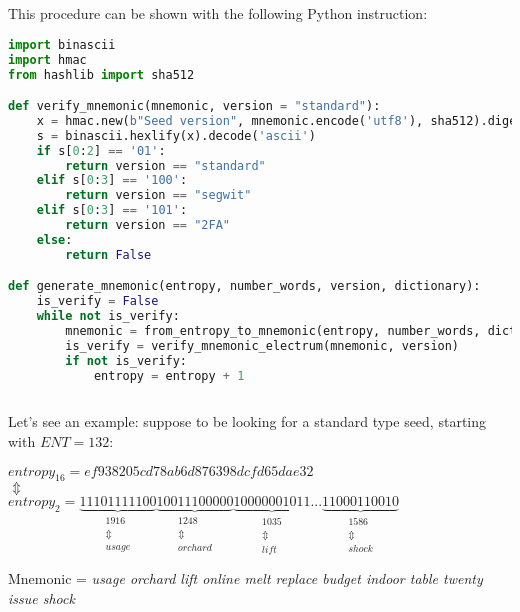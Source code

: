 \\ \\ 
This procedure can be shown with the following Python instruction:
\begin{lstlisting}[language=Python]
import binascii
import hmac
from hashlib import sha512

def verify_mnemonic(mnemonic, version = "standard"):
	x = hmac.new(b"Seed version", mnemonic.encode('utf8'), sha512).digest()
	s = binascii.hexlify(x).decode('ascii')
	if s[0:2] == '01':
		return version == "standard"
	elif s[0:3] == '100':
		return version == "segwit"
	elif s[0:3] == '101':
		return version == "2FA"
	else:
		return False

def generate_mnemonic(entropy, number_words, version, dictionary):	
	is_verify = False
	while not is_verify:
		mnemonic = from_entropy_to_mnemonic(entropy, number_words, dictionary)
		is_verify = verify_mnemonic_electrum(mnemonic, version)
		if not is_verify:
			entropy = entropy + 1
		
\end{lstlisting}

\begin{flushleft}
	Let's see an example: suppose to be looking for a standard type seed, starting with $ENT=132$:
\end{flushleft}

\begin{center} 
	$ entropy_{16} = ef938205cd78ab6d876398dcfd65dae32 $ 
	\\
	$\Updownarrow $
	\\
	$entropy_{2}= \underbrace{11101111100}_{\substack{1916 \\ \Updownarrow\\ usage} }
	\underbrace{10011100000}_{\substack{1248 \\ \Updownarrow\\ orchard}}
	\underbrace{10000001011}_{\substack{1035 \\ \Updownarrow\\ lift}}
	...
	\underbrace{11000110010}_{\substack{1586 \\ \Updownarrow\\ shock}}  $
\end{center}
Mnemonic = \textit{usage orchard lift online melt replace budget indoor table twenty issue shock}

